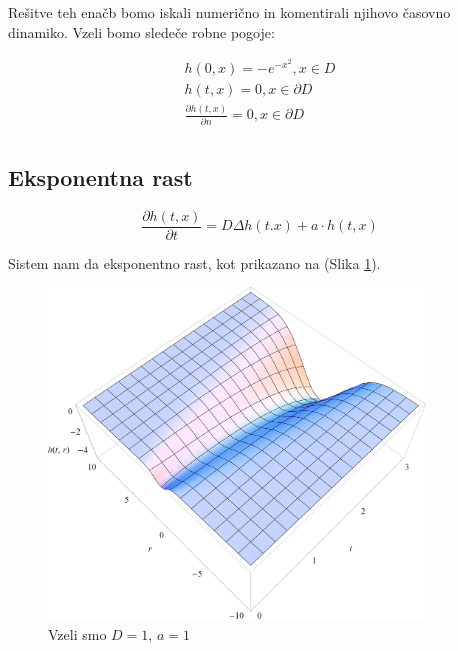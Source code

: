 \documentclass[a4paper, oneside, 12pt]{book}
\begin{document}
          Rešitve teh enačb bomo iskali numerično in komentirali njihovo časovno dinamiko. Vzeli bomo sledeče robne pogoje:

        \begin{equation}
          \begin{aligned}
            h(0,x) =  - e^{-x^2}, x \in D \\
            h(t,x) = 0, x \in \partial D \\
            \frac{\partial h(t,x)}{\partial n} = 0, x \in \partial D \\
          \end{aligned}
        \end{equation}


          \subsection{Eksponentna rast}

            \begin{equation}
              \frac{ \partial h(t,x) }{ \partial t} = D \Delta h(t.x) + a \cdot h(t,x)
              \label{difuzija-eksponentna-rast}
            \end{equation}

            Sistem nam da eksponentno rast, kot prikazano na (Slika \ref{fig:difuzija-eksponentna-rast}).

            \begin{figure}[H]
              \begin{center}
                \includegraphics[width=10cm]{slike/difuzija-eksponentna-rast2}
              \end{center}
              \caption{Vzeli smo $D=1$, $a=1$}
              \label{fig:difuzija-eksponentna-rast}
            \end{figure}
\end{document}
